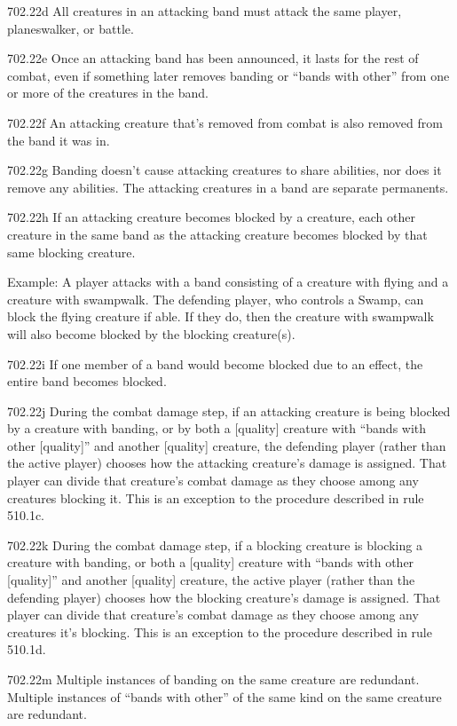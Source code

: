 702.22d All creatures in an attacking band must attack the same player, planeswalker, or battle.

702.22e Once an attacking band has been announced, it lasts for the rest of combat, even if something later removes banding or “bands with other” from one or more of the creatures in the band.

702.22f An attacking creature that’s removed from combat is also removed from the band it was in.

702.22g Banding doesn’t cause attacking creatures to share abilities, nor does it remove any abilities. The attacking creatures in a band are separate permanents.

702.22h If an attacking creature becomes blocked by a creature, each other creature in the same band as the attacking creature becomes blocked by that same blocking creature.

Example: A player attacks with a band consisting of a creature with flying and a creature with swampwalk. The defending player, who controls a Swamp, can block the flying creature if able. If they do, then the creature with swampwalk will also become blocked by the blocking creature(s).

702.22i If one member of a band would become blocked due to an effect, the entire band becomes blocked.

702.22j During the combat damage step, if an attacking creature is being blocked by a creature with banding, or by both a [quality] creature with “bands with other [quality]” and another [quality] creature, the defending player (rather than the active player) chooses how the attacking creature’s damage is assigned. That player can divide that creature’s combat damage as they choose among any creatures blocking it. This is an exception to the procedure described in rule 510.1c.

702.22k During the combat damage step, if a blocking creature is blocking a creature with banding, or both a [quality] creature with “bands with other [quality]” and another [quality] creature, the active player (rather than the defending player) chooses how the blocking creature’s damage is assigned. That player can divide that creature’s combat damage as they choose among any creatures it’s blocking. This is an exception to the procedure described in rule 510.1d.

702.22m Multiple instances of banding on the same creature are redundant. Multiple instances of “bands with other” of the same kind on the same creature are redundant.

